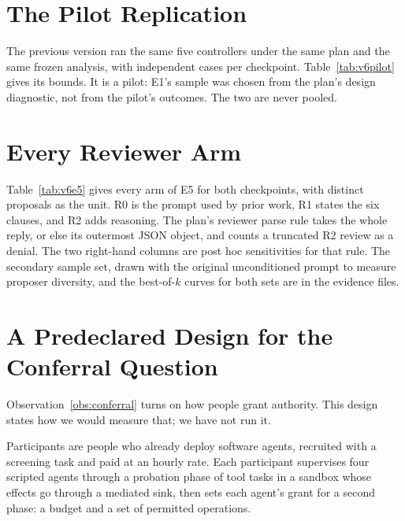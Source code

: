 \section{The Pilot Replication}\label{app:v6e1}

The previous version ran the same five controllers under the same plan and the same frozen analysis, with
\vsixPilotN{} independent cases per checkpoint. \vsixPilotSentence{} Table~\ref{tab:v6pilot} gives its bounds. It is a
pilot: E1's sample was chosen from the plan's design diagnostic, not from the pilot's outcomes. The two are never
pooled.



\section{Every Reviewer Arm}\label{app:v6e5}

Table~\ref{tab:v6e5} gives every arm of E5 for both checkpoints, with distinct proposals as the unit. R0 is the
prompt used by prior work, R1 states the six clauses, and R2 adds reasoning. The plan's reviewer parse rule takes the
whole reply, or else its outermost JSON object, and counts a truncated R2 review as a denial. The two right-hand
columns are post hoc sensitivities for that rule. The secondary sample set, drawn with the original unconditioned
prompt to measure proposer diversity, and the best-of-\(k\) curves for both sets are in the evidence files.



\section{A Predeclared Design for the Conferral Question}\label{app:v6conferral}

Observation~\ref{obs:conferral} turns on how people grant authority. This design states how we would measure that;
we have not run it.

 Participants are people who already deploy software agents, recruited with a screening
task and paid at an hourly rate. Each participant supervises four scripted agents through a probation phase of tool
tasks in a sandbox whose effects go through a mediated sink, then sets each agent's grant for a second phase: a
budget and a set of permitted operations.

